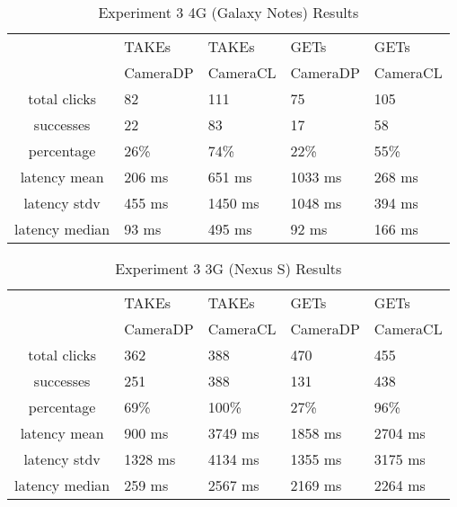 \begin{table}[htb]
\begin{scriptsize} 
\caption{Experiment 3 4G (Galaxy Notes) Results} 
\label{table:exp-3-4g-results}
 \begin{center}
 \begin{tabular}{| c | p{1.5cm} | p{1.5cm} | p{1.5cm} | p{1.4cm} |}
  \hline
  & TAKEs & TAKEs & GETs & GETs \\
  & CameraDP & CameraCL & CameraDP & CameraCL \\
  \hline
  total clicks & 82 & 111 & 75 & 105 \\
  \hline
  successes & 22 & 83 & 17 & 58 \\
  \hline
  percentage & 26\% & 74\% & 22\% & 55\% \\
  \hline
  latency mean & 206 ms & 651 ms & 1033 ms & 268 ms \\
  \hline
  latency stdv & 455 ms &1450 ms &1048 ms & 394 ms \\
  \hline
  latency median & 93 ms & 495 ms & 92 ms & 166 ms \\
  \hline
  \end{tabular}
  \end{center}
\end{scriptsize}
\end{table}

\begin{table}[htb]
\begin{scriptsize} 
\caption{Experiment 3 3G (Nexus S) Results} 
\label{table:exp-3-3g-results}
 \begin{center}
 \begin{tabular}{| c | p{1.5cm} | p{1.5cm} | p{1.5cm} | p{1.4cm} |}
  \hline
  & TAKEs & TAKEs & GETs & GETs \\
  & CameraDP & CameraCL & CameraDP & CameraCL \\
  \hline
  total clicks & 362 & 388 & 470 & 455 \\
  \hline
  successes & 251 & 388 & 131 & 438 \\
  \hline
  percentage & 69\% & 100\% & 27\% & 96\% \\
  \hline
  latency mean & 900 ms & 3749 ms & 1858 ms & 2704 ms \\
  \hline
  latency stdv & 1328 ms & 4134 ms &1355 ms & 3175 ms \\
  \hline
  latency median & 259 ms & 2567 ms & 2169 ms & 2264 ms \\
  \hline
  \end{tabular}
  \end{center}
\end{scriptsize}
\end{table}

